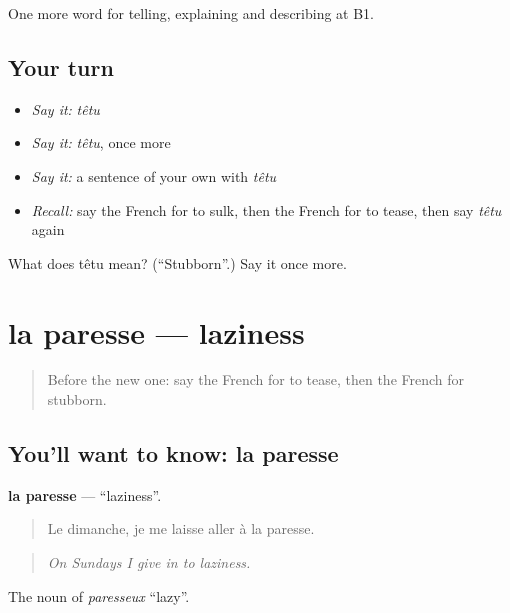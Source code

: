 \begin{grammarlens}[title={What you've built}]
One more word for telling, explaining and describing at B1.
\end{grammarlens}

\subsection*{Your turn}
\begin{itemize}
\raggedright
  \item \emph{Say it:} \emph{têtu}
  \item \emph{Say it:} \emph{têtu}, once more
  \item \emph{Say it:} a sentence of your own with \emph{têtu}
  \item \emph{Recall:} say the French for to sulk, then the French for to tease, then say \emph{têtu} again
\end{itemize}

\begin{tcolorbox}[breakable,colback=teal!4,colframe=teal!35!black,title={Before you move on}]
What does têtu mean? (\textquotedblleft{}Stubborn\textquotedblright{}.) Say it once more.
\end{tcolorbox}
\section[la paresse]{la paresse — laziness}

\label{lesson:FR-C467-paresse}



\begin{quote}
Before the new one: say the French for to tease, then the French for stubborn.
\end{quote}

\subsection*{You'll want to know: la paresse}
\textbf{la paresse} — \textquotedblleft{}laziness\textquotedblright{}.

\begin{quote}
Le dimanche, je me laisse aller à la paresse.
\end{quote}

\begin{quote}
\emph{On Sundays I give in to laziness.}
\end{quote}

The noun of \emph{paresseux} \textquotedblleft{}lazy\textquotedblright{}.

